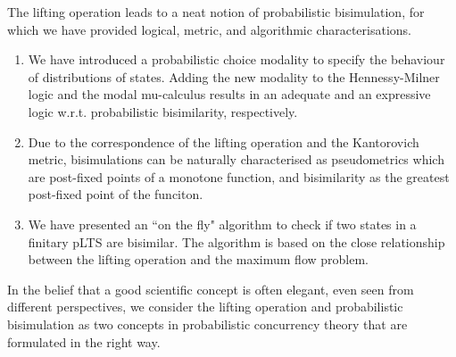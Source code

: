 \documentclass{article}
\begin{document}
The lifting operation leads to a neat notion of probabilistic
bisimulation, for which we have provided logical, metric, and
algorithmic characterisations.
\begin{enumerate}
\item We have
introduced a probabilistic choice modality to specify the behaviour
of distributions of states. Adding the new modality to the
Hennessy-Milner logic and the modal mu-calculus results in an
adequate and an expressive logic w.r.t. probabilistic bisimilarity,
respectively.

\item Due to the correspondence of the lifting operation and the
Kantorovich metric, bisimulations can be naturally characterised as
pseudometrics which are post-fixed points of a monotone function,
and bisimilarity as the greatest post-fixed point of the funciton.

\item We have presented an ``on the fly" algorithm to check if two
states in a finitary pLTS are bisimilar. The algorithm is based on
the close relationship between the lifting operation and the maximum
flow problem.
\end{enumerate}
In the belief that a good scientific concept is often elegant, even
seen from different perspectives, we consider the lifting operation
and probabilistic bisimulation as two concepts in probabilistic
concurrency theory that are formulated in the right way.




\end{document}

